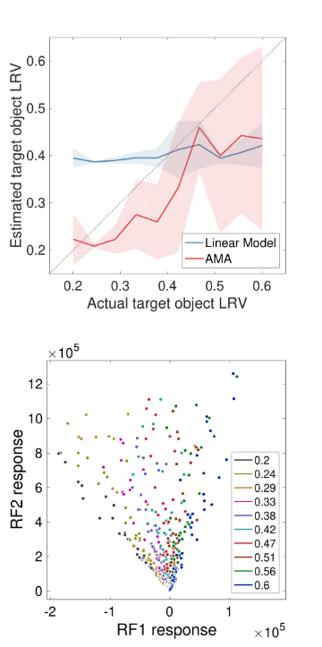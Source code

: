 \documentclass{jov}
\begin{document}
\begin{figure}
\centering
    \begin{subfigure}[b]{0.22\textwidth}   
        \caption{ \newline{}}
        \includegraphics[width=\textwidth, trim={0 0 0 1.5cm},clip]{../FiguresDraft5/Figure11/Figure11_a.pdf}
        \label{fig:case2IsomerizationEstimates}
    \end{subfigure}
        \begin{subfigure}[b]{0.22 \textwidth}
        \caption{ \newline{}}
        \includegraphics[width=\textwidth, trim={0 0 0 1.5cm},clip]{../FiguresDraft5/Figure11/Figure11_b.pdf}

\end{subfigure}
\end{figure}
\end{document}

